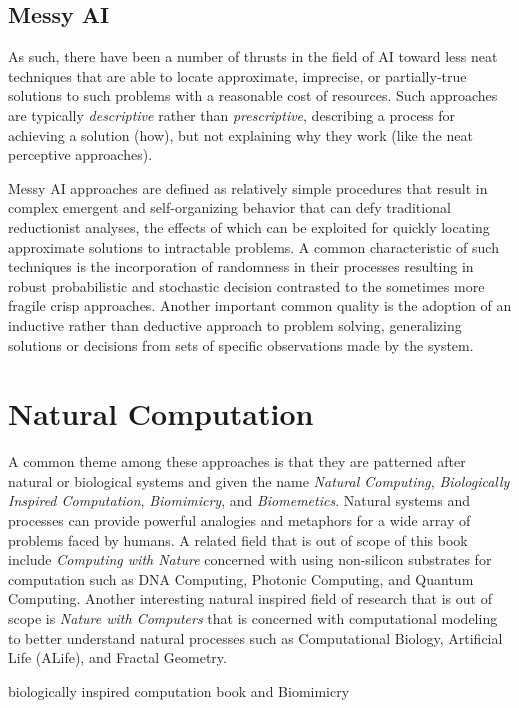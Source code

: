 \documentclass[a4paper, 11pt]{article}
\begin{document}
\subsection{Messy AI}
As such, there have been a number of thrusts in the field of AI toward less neat techniques that are able to locate approximate, imprecise, or partially-true solutions to such problems with a reasonable cost of resources. Such approaches are typically \emph{descriptive} rather than \emph{prescriptive}, describing a process for achieving a solution (how), but not explaining why they work (like the neat perceptive approaches). 

Messy AI approaches are defined as relatively simple procedures that result in complex emergent and self-organizing behavior that can defy traditional reductionist analyses, the effects of which can be exploited for quickly locating approximate solutions to intractable problems. A common characteristic of such techniques is the incorporation of randomness in their processes resulting in robust probabilistic and stochastic decision contrasted to the sometimes more fragile crisp approaches. Another important common quality is the adoption of an inductive rather than deductive approach to problem solving, generalizing solutions or decisions from sets of specific observations made by the system.


% 
% 
\section{Natural Computation}
A common theme among these approaches is that they are patterned after natural or biological systems and given the name \emph{Natural Computing}, \emph{Biologically Inspired Computation}, \emph{Biomimicry}, and \emph{Biomemetics}. Natural systems and processes can provide powerful analogies and metaphors for a wide array of problems faced by humans. A related field that is out of scope of this book include \emph{Computing with Nature} concerned with using non-silicon substrates for computation such as DNA Computing, Photonic Computing, and Quantum Computing. Another interesting natural inspired field of research that is out of scope is \textit{Nature with Computers} that is concerned with computational modeling to better understand natural processes such as Computational Biology, Artificial Life (ALife), and Fractal Geometry.

biologically inspired computation book \cite{Castro2005} and \cite{Forbes2005}
Biomimicry \cite{Benyus1998}
\end{document}
